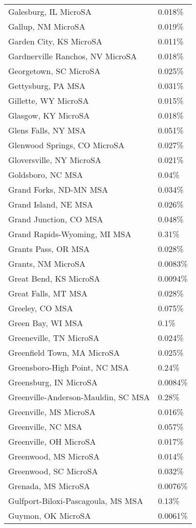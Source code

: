 \begin{longtable}[]{@{}ll@{}}
Galesburg, IL MicroSA & 0.018\% \\
Gallup, NM MicroSA & 0.019\% \\
Garden City, KS MicroSA & 0.011\% \\
Gardnerville Ranchos, NV MicroSA & 0.018\% \\
Georgetown, SC MicroSA & 0.025\% \\
Gettysburg, PA MSA & 0.031\% \\
Gillette, WY MicroSA & 0.015\% \\
Glasgow, KY MicroSA & 0.018\% \\
Glens Falls, NY MSA & 0.051\% \\
Glenwood Springs, CO MicroSA & 0.027\% \\
Gloversville, NY MicroSA & 0.021\% \\
Goldsboro, NC MSA & 0.04\% \\
Grand Forks, ND-MN MSA & 0.034\% \\
Grand Island, NE MSA & 0.026\% \\
Grand Junction, CO MSA & 0.048\% \\
Grand Rapids-Wyoming, MI MSA & 0.31\% \\
Grants Pass, OR MSA & 0.028\% \\
Grants, NM MicroSA & 0.0083\% \\
Great Bend, KS MicroSA & 0.0094\% \\
Great Falls, MT MSA & 0.028\% \\
Greeley, CO MSA & 0.075\% \\
Green Bay, WI MSA & 0.1\% \\
Greeneville, TN MicroSA & 0.024\% \\
Greenfield Town, MA MicroSA & 0.025\% \\
Greensboro-High Point, NC MSA & 0.24\% \\
Greensburg, IN MicroSA & 0.0084\% \\
Greenville-Anderson-Mauldin, SC MSA & 0.28\% \\
Greenville, MS MicroSA & 0.016\% \\
Greenville, NC MSA & 0.057\% \\
Greenville, OH MicroSA & 0.017\% \\
Greenwood, MS MicroSA & 0.014\% \\
Greenwood, SC MicroSA & 0.032\% \\
Grenada, MS MicroSA & 0.0076\% \\
Gulfport-Biloxi-Pascagoula, MS MSA & 0.13\% \\
Guymon, OK MicroSA & 0.0061\% \\

\end{longtable}
